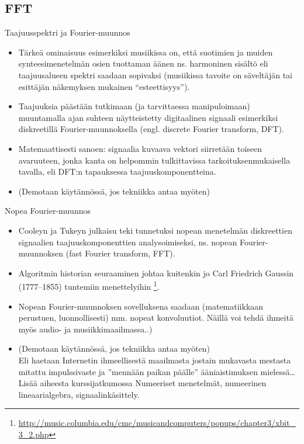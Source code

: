 \documentclass[pdf,9pt,handout]{beamer}
\begin{document}
\subsection{FFT}

\begin{frame}{Taajuusspektri ja Fourier-muunnos}
  \begin{itemize}
\item
  Tärkeä ominaisuus esimerkiksi musiikissa on, että suotimien ja
  muiden synteesimenetelmän osien tuottaman äänen ns. harmoninen
  sisältö eli taajuusalueen spektri saadaan sopivaksi (musiikissa
  tavoite on säveltäjän tai esittäjän näkemyksen mukainen
  ``esteettisyys'').
\item
  Taajuuksia päästään
  tutkimaan (ja tarvittaessa manipuloimaan) muuntamalla ajan suhteen
  näytteistetty digitaalinen signaali esimerkiksi diskreetillä
  Fourier-muunnoksella (engl. discrete Fourier transform,
  DFT).
\item
  Matemaattisesti sanoen: signaalia kuvaava vektori siirretään
  toiseen avaruuteen, jonka kanta on helpommin tulkittavissa
  tarkoituksenmukaisella tavalla, eli DFT:n tapauksessa
  taajuuskomponentteina.
\item[]
  (Demotaan käytännössä, jos tekniikka antaa myöten)
  \end{itemize}
  
\end{frame}

\begin{frame}{Nopea Fourier-muunnos}
\begin{itemize}
\item
  Cooleyn ja Tukeyn julkaisu \cite{CooleyTukey1965fft} teki tunnetuksi
  nopean menetelmän diskreettien signaalien taajuuskomponenttien
  analysoimiseksi, ns. nopean Fourier-muunnoksen (fast Fourier
  transform, FFT).
\item
  Algoritmin historian seuraaminen johtaa kuitenkin jo Carl
  Friedrich Gaussin (1777--1855) tuntemiin menettelyihin
  \footnote{\url{http://music.columbia.edu/cmc/musicandcomputers/popups/chapter3/xbit_3_2.php}}.
\item
  Nopean Fourier-muunnoksen sovelluksena saadaan (matematiikkaan
  perustuen, luonnollisesti) mm. nopeat konvoluutiot. Näillä voi tehdä
  ihmeitä myös audio- ja musiikkimaailmassa..)
\item[] (Demotaan käytännössä, jos tekniikka antaa myöten)\\ Eli
  haetaan Internetin ihmeellisestä maailmasta jostain mukavasta
  mestasta mitattu impulssivaste ja ''mennään paikan päälle'' ääniaistimuksen
  mielessä\ldots Lisää aiheesta kurssijatkumossa Numeeriset
  menetelmät, numeerinen lineaarialgebra, signaalinkäsittely.
\end{itemize}
\end{frame}
\end{document}
